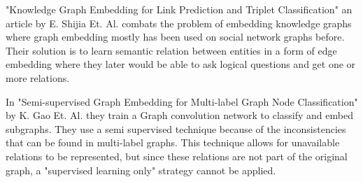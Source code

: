 "Knowledge Graph Embedding for Link Prediction and Triplet Classification" an article by E. Shijia Et. Al. \cite{10.1007/978-981-10-3168-7_23} combats the problem of embedding knowledge graphs where graph embedding mostly has been used on social network graphs before.  Their solution is to learn semantic relation between entities in a form of edge embedding where they later would be able to ask logical questions and get one or more relations.

In "Semi-supervised Graph Embedding for Multi-label Graph Node Classification" by K. Gao Et. Al.\cite{10.1007/978-3-030-34223-4_35} they train a Graph convolution network to classify and embed subgraphs. They use a semi supervised technique because of the inconsistencies that can be found in multi-label graphs. This technique allows for unavailable relations to be represented, but since these relations are not part of the original graph, a "supervised learning only" strategy cannot be applied.
